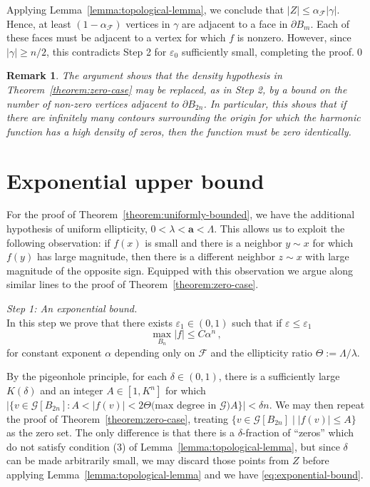 \documentclass{daj}
\newtheorem{remark}[theorem]{Remark}
\newcommand{\G}{\mathcal{G}}
\newcommand{\cond}{\mathbf{a}}
\newcommand{\eps}{\varepsilon}
\begin{document}
Applying Lemma~\ref{lemma:topological-lemma}, we conclude that $|Z| \leq \alpha_{\mathcal{F}} |\gamma|$.
Hence, at least $(1- \alpha_{\mathcal{F}} )$ vertices in $\gamma$ are adjacent to a face in $\partial B_{m}$.
Each of these faces must be adjacent to a vertex for which $f$ is nonzero.
However, since $|\gamma| \geq n/2$, this contradicts Step 2 for $\eps_0$ sufficiently small, completing the proof.\qed

\begin{remark}
	The argument shows that the density hypothesis in Theorem~\ref{theorem:zero-case} may be replaced,
	as in Step 2, by a bound on the number of non-zero vertices adjacent to $\partial B_{2 n}$.
	In particular, this shows that if there are infinitely many contours surrounding the origin for
	which the harmonic function has a high density of zeros, then the function must be zero identically.
\end{remark}


\section{Exponential upper bound}\label{sec:bounded-case}
For the proof of Theorem~\ref{theorem:uniformly-bounded}, we have the additional hypothesis of uniform ellipticity,
$0 < \lambda < \cond < \Lambda$. This allows us to exploit the following observation: if $f(x)$ is small
and there is a neighbor $y \sim x$ for which $f(y)$ has large magnitude,  then there is a different neighbor $z \sim x$ with large magnitude
of the opposite sign.  Equipped with this observation we argue along similar lines to the proof of Theorem~\ref{theorem:zero-case}.
\smallskip

{\it Step 1: An exponential bound.} \\
In this step we prove that there exists $\eps_1 \in (0,1)$ such that if $\eps \leq \eps_1$
\begin{equation} \label{eq:exponential-bound}
	\max_{B_n} |f| \leq C \alpha^n \, ,
\end{equation}
for constant exponent $\alpha$ depending only on $\mathcal{F}$ and the ellipticity ratio $\Theta := \Lambda/\lambda$.

By the pigeonhole principle, for each $\delta \in (0,1)$, there is a sufficiently large $K(\delta)$
and an integer $A \in [1, K^n]$ for which $|\{v \in \G[B_{2 n }] : A < |f(v)| < 2 \Theta \mbox{(max degree in $\G$)} A\}| < \delta n $.
We may then repeat the proof of Theorem~\ref{theorem:zero-case}, treating $\{v \in \G[B_{2 n }] \mid |f(v)| \leq  A\}$
as the zero set. The only difference is that there is a $\delta$-fraction of ``zeros''
which do not satisfy condition (3) of Lemma~\ref{lemma:topological-lemma}, but since $\delta$ can be
made arbitrarily small, we may discard those points from $Z$ before applying Lemma~\ref{lemma:topological-lemma} and we have \eqref{eq:exponential-bound}.
\smallskip
\end{document}
